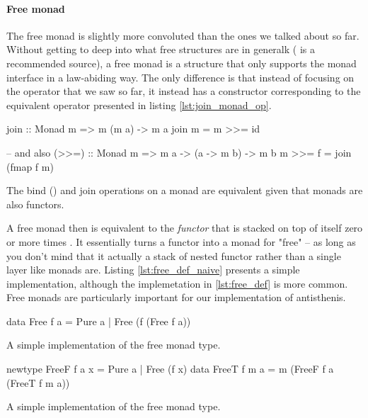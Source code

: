 \paragraph{Free monad}

The free monad is slightly more convoluted than the ones we talked
about so far. Without getting to deep into what free structures are in
generalk (\cite{bartoszmilewskiDaoFunctionalProgramming} is a
recommended source), a free monad is a structure that only supports
the monad interface in a law-abiding way. The only difference is that
instead of focusing on the \hask{>>=} operator that we saw so far, it
instead has a constructor corresponding to the equivalent operator
 presented in listing \ref{lst:join_monad_op}.

\begin{code}
\begin{haskellcode}
join :: Monad m => m (m a) -> m a
join m = m >>= id

-- and also
(>>=) :: Monad m => m a -> (a -> m b) -> m b
m >>= f = join (fmap f m)
\end{haskellcode}
\label{lst:join_monad_op}
\caption{The bind (\hask{>>=}) and join operations on a monad are
  equivalent given that monads are also functors.}
\end{code}

A free monad  then is equivalent to the \emph{functor}
 that is stacked on top of itself zero or more times . It essentially turns a functor into a monad for
"free" -- as long as you don't mind that it actually a stack of nested
functor rather than a single layer like monads are. Listing
\ref{lst:free_def_naive} presents a simple implementation, although
the implemetation in \ref{lst:free_def} is more common. Free monads
are particularly important for our implementation of antisthenis.

\begin{code}
\begin{haskellcode}
data Free f a
  = Pure a
  | Free (f (Free f a))
\end{haskellcode}
  \caption{\label{lst:free_def_naive}A simple implementation of the free
    monad type.}
\end{code}

\begin{code}
\begin{haskellcode}
newtype FreeF f a x = Pure a | Free (f x)
data FreeT f m a = m (FreeF f a (FreeT f m a))
\end{haskellcode}
\label{lst:free_def}
\caption{A simple implementation of the free monad type.}
\end{code}

